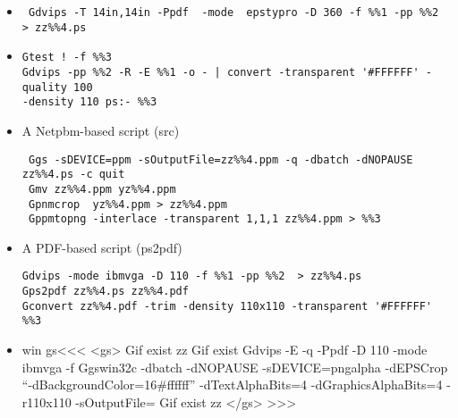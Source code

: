 \documentclass{article}
\begin{document}
\begin{itemize}
\item
\begin{verbatim}
 Gdvips -T 14in,14in -Ppdf  -mode  epstypro -D 360 -f %%1 -pp %%2  > zz%%4.ps
\end{verbatim}

\item
\begin{verbatim}
Gtest ! -f %%3  
Gdvips -pp %%2 -R -E %%1 -o - | convert -transparent '#FFFFFF' -quality 100   
-density 110 ps:- %%3  
\end{verbatim}

\item
{A 
Netpbm-based script
(src\EndLink{})}

\begin{verbatim}
 Ggs -sDEVICE=ppm -sOutputFile=zz%%4.ppm -q -dbatch -dNOPAUSE zz%%4.ps -c quit
 Gmv zz%%4.ppm yz%%4.ppm
 Gpnmcrop  yz%%4.ppm > zz%%4.ppm
 Gppmtopng -interlace -transparent 1,1,1 zz%%4.ppm > %%3
\end{verbatim}

\item
{A 
PDF-based script
(ps2pdf\EndLink{})}
\begin{verbatim}
Gdvips -mode ibmvga -D 110 -f %%1 -pp %%2  > zz%%4.ps
Gps2pdf zz%%4.ps zz%%4.pdf
Gconvert zz%%4.pdf -trim -density 110x110 -transparent '#FFFFFF' %%3
\end{verbatim}


\item

\<win gs\><<<
<gs>
Gif exist zz%
Gif exist %
Gdvips -E -q -Ppdf -D 110 -mode ibmvga -f %
Ggswin32c -dbatch -dNOPAUSE -sDEVICE=pngalpha -dEPSCrop ``-dBackgroundColor=16#ffffff'' -dTextAlphaBits=4 -dGraphicsAlphaBits=4 -r110x110 -sOutputFile=%
Gif exist zz%
</gs>
>>>


\end{itemize}
\end{document}
